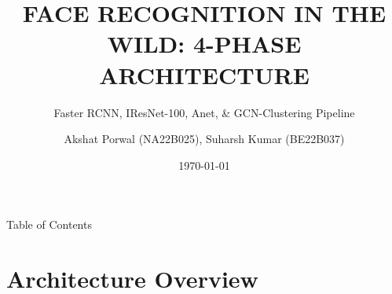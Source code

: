 \documentclass[t]{beamer}
\title[Face Recognition In The Wild]{FACE RECOGNITION IN THE WILD: 4-PHASE ARCHITECTURE}
\subtitle{Faster RCNN, IResNet-100, Anet, \& GCN-Clustering Pipeline}
\author[Face Recognition Team]{Akshat Porwal (NA22B025), Suharsh Kumar (BE22B037)}
\date{\today}
\begin{document}

\begin{frame}
    \titlepage

\end{frame}


\begin{frame}{Table of Contents}
    \tableofcontents
\end{frame}
\usebackgroundtemplate{}
\section{Architecture Overview}
\end{document}
